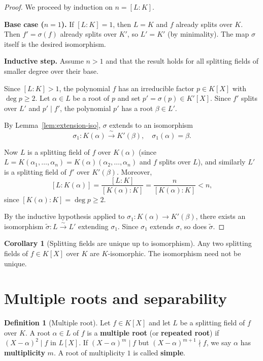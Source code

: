 \documentclass[12pt,a4paper,openany]{book}
\theoremstyle{definition}
\newtheorem{definition}{Definition}[chapter]
\newtheorem{corollary}{Corollary}[chapter]
\theoremstyle{remark}
\renewcommand{\deg}{\operatorname{deg}}
\begin{document}
\begin{proof}
We proceed by induction on $n = [L:K]$.

\textbf{Base case ($n = 1$).} If $[L:K] = 1$, then $L = K$ and $f$
already splits over $K$. Then $f' = \sigma(f)$ already splits over
$K'$, so $L' = K'$ (by minimality). The map $\sigma$ itself is the
desired isomorphism.

\textbf{Inductive step.} Assume $n > 1$ and that the result holds for
all splitting fields of smaller degree over their base.

Since $[L:K] > 1$, the polynomial $f$ has an irreducible factor
$p \in K[X]$ with $\deg p \ge 2$. Let $\alpha \in L$ be a root of $p$
and set $p' = \sigma(p) \in K'[X]$. Since $f'$ splits over $L'$ and
$p' \mid f'$, the polynomial $p'$ has a root $\beta \in L'$.

By Lemma~\ref{lem:extension-iso}, $\sigma$ extends to an isomorphism
\[
  \sigma_1 \colon K(\alpha) \xrightarrow{\;\sim\;} K'(\beta),
  \quad \sigma_1(\alpha) = \beta.
\]

Now $L$ is a splitting field of $f$ over $K(\alpha)$ (since
$L = K(\alpha_1, \dots, \alpha_n) = K(\alpha)(\alpha_2, \dots,
\alpha_n)$ and $f$ splits over $L$), and similarly $L'$ is a
splitting field of $f'$ over $K'(\beta)$. Moreover,
\[
  [L : K(\alpha)] = \frac{[L:K]}{[K(\alpha):K]}
  = \frac{n}{[K(\alpha):K]} < n,
\]
since $[K(\alpha):K] = \deg p \ge 2$.

By the inductive hypothesis applied to $\sigma_1 \colon K(\alpha) \to
K'(\beta)$, there exists an isomorphism
$\tilde{\sigma} \colon L \xrightarrow{\sim} L'$ extending $\sigma_1$.
Since $\sigma_1$ extends $\sigma$, so does $\tilde{\sigma}$.
\end{proof}

\begin{corollary}[Splitting fields are unique up to isomorphism]
\label{cor:splitting-unique-isom}
Any two splitting fields of $f \in K[X]$ over $K$ are $K$-isomorphic.
The isomorphism need not be unique.
\end{corollary}

\section{Multiple roots and separability}
\label{sec:separability}

\begin{definition}[Multiple root]
\label{def:multiple-root}
Let $f \in K[X]$ and let $L$ be a splitting field of $f$ over $K$.
A root $\alpha \in L$ of $f$ is a \textbf{multiple root} (or
\textbf{repeated root}) if $(X - \alpha)^2 \mid f$ in $L[X]$. If
$(X - \alpha)^m \mid f$ but $(X - \alpha)^{m+1} \nmid f$, we say
$\alpha$ has \textbf{multiplicity} $m$.
A root of multiplicity $1$ is called \textbf{simple}.
\end{definition}
\end{document}
